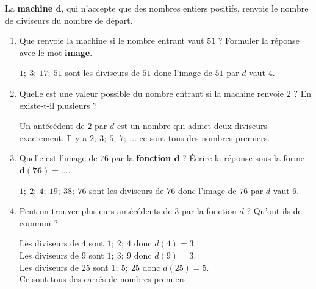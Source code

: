 \begin{corrige}
    La \textbf{machine $\boldsymbol{d}$}, qui n'accepte que des nombres entiers positifs, renvoie le nombre de diviseurs du nombre de départ.

    \hspace*{-13mm}
    \begin{enumerate}
        \item Que renvoie la machine si le nombre entrant vaut $51$ ? Formuler la réponse avec le mot \textbf{image}.
        
        {\red $1;~3;~17;~51$ sont les diviseurs de $51$ donc l'image de $51$ par $d$ vaut $4$.}
        \item Quelle est une valeur possible du nombre entrant si la machine renvoie  $2$ ? En existe-t-il plusieurs ?
        
        {\red Un antécédent de $2$ par $d$ est un nombre qui admet deux diviseurs exactement. Il y a $2;~3;~5;~7;~\dots$ ce sont tous des nombres premiers.}
        \item Quelle est l'image de $76$ par la \textbf{fonction $\boldsymbol{d}$} ? Écrire la réponse sous la forme $\boldsymbol{d(76)=\ldots}$.
        
        {\red $1;~2;~4;~19;~38;~76$ sont les diviseurs de $76$ donc l'image de $76$ par $d$ vaut $6$.}
        \item Peut-on trouver plusieurs antécédents de 3 par la fonction $d$ ? Qu'ont-ils de commun ?
        
        {\red Les diviseurs de $4$ sont $1;~2;~4$ donc $d(4) = 3$.\\
        Les diviseurs de $9$ sont $1;~3;~9$ donc $d(9) = 3$.\\
        Les diviseurs de $25$ sont $1;~5;~25$ donc $d(25) = 5$.\\
        Ce sont tous des carrés de nombres premiers.       
        }
    \end{enumerate}
\end{corrige}
